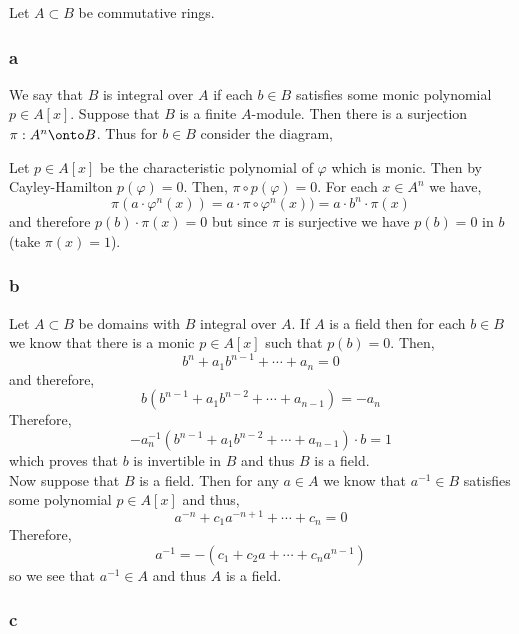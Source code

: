 \documentclass[12pt]{article}
\begin{document}
Let $A \subset B$ be commutative rings. 

\subsubsection{a}

We say that $B$ is integral over $A$ if each $b \in B$ satisfies some monic polynomial $p \in A[x]$. Suppose that $B$ is a finite $A$-module. Then there is a surjection $\pi : A^n \onto B$. Thus for $b \in B$ consider the diagram,
\begin{center}
\end{center}
Let $p \in A[x]$ be the characteristic polynomial of $\varphi$ which is monic. Then by Cayley-Hamilton $p(\varphi) = 0$. Then, $\pi \circ p(\varphi) = 0$. For each $x \in A^n$ we have,
\[ \pi(a \cdot \varphi^n(x)) = a \cdot \pi \circ \varphi^n(x)) = a \cdot b^n \cdot \pi(x) \]
and therefore $p(b) \cdot \pi(x) = 0$ but since $\pi$ is surjective we have $p(b) = 0$ in $b$ (take $\pi(x) = 1$).

\subsubsection{b}

Let $A \subset B$ be domains with $B$ integral over $A$. If $A$ is a field then for each $b \in B$ we know that there is a monic $p \in A[x]$ such that $p(b) = 0$. Then,
\[ b^n + a_{1} b^{n-1} + \cdots + a_n = 0 \]
and therefore,
\[ b(b^{n-1} + a_1 b^{n-2} + \cdots + a_{n-1}) = - a_n \]
Therefore,
\[ - a_n^{-1} (b^{n-1} + a_1 b^{n-2} + \cdots + a_{n-1}) \cdot b = 1 \]
which proves that $b$ is invertible in $B$ and thus $B$ is a field. 
\bigskip\\
Now suppose that $B$ is a field. Then for any $a \in A$ we know that $a^{-1} \in B$ satisfies some polynomial $p \in A[x]$ and thus,
\[ a^{-n} + c_{1} a^{-n+1} + \cdots + c_n = 0 \]
Therefore,
\[ a^{-1} = -(c_1 + c_2 a + \cdots + c_n a^{n-1}) \]
so we see that $a^{-1} \in A$ and thus $A$ is a field.

\subsubsection{c}
\end{document}
